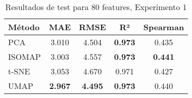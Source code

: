 \begin{table}[h]
\centering
\begin{tabular}{lcccc}
\toprule
\textbf{Método} & \textbf{MAE} & \textbf{RMSE} & \textbf{R²} & \textbf{Spearman} \\
\midrule
PCA & 3.010 & 4.504 & \textbf{0.973} & 0.435 \\
ISOMAP & 3.003 & 4.557 & \textbf{0.973} & \textbf{0.441} \\
t-SNE & 3.053 & 4.670 & 0.971 & 0.427 \\
UMAP & \textbf{2.967} & \textbf{4.495} & \textbf{0.973} & 0.440 \\
\bottomrule
\end{tabular}
\caption{Resultados de test para 80 features, Experimento 1}
\label{tab:test_results_80feat_exp1}
\end{table}